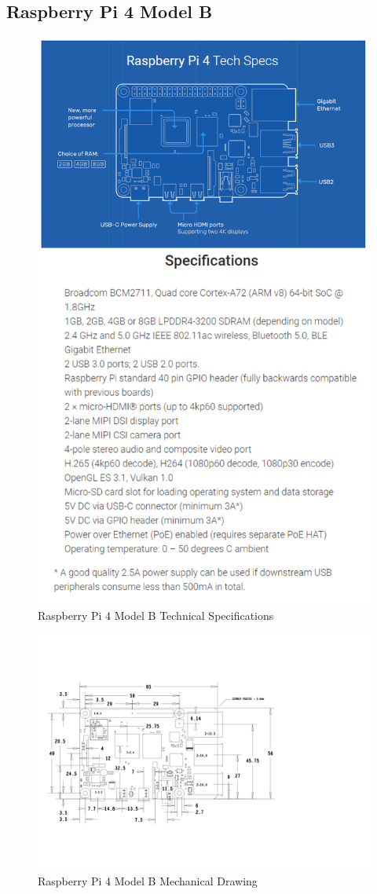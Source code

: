 \subsection{Raspberry Pi 4 Model B}
\label{appendix:raspberry-pi-4-model-b}

\begin{figure}[H]
    \centering
    \includegraphics[width=0.7\linewidth]{texs/appendix/data/techspecs/pi-specs.png}
    \caption{Raspberry Pi 4 Model B Technical Specifications}
    \label{fig:rpi-1}
\end{figure}

\begin{figure}[H]
    \centering
    \includegraphics[width=\linewidth, angle=90]{texs/appendix/data/techspecs/pimechdraw.jpg}
    \caption{Raspberry Pi 4 Model B Mechanical Drawing}
    \label{fig:rpi-2}
\end{figure}

